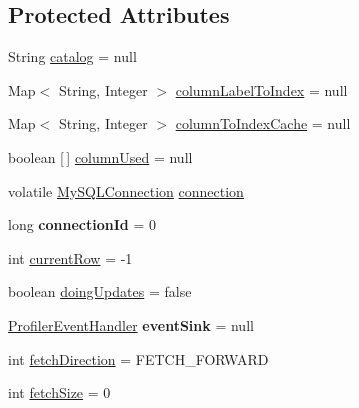 \subsection*{Protected Attributes}
\begin{DoxyCompactItemize}
\item 
String \mbox{\hyperlink{classcom_1_1mysql_1_1jdbc_1_1_result_set_impl_ae05d8a0ad69c96645b783537100fb95c}{catalog}} = null
\item 
Map$<$ String, Integer $>$ \mbox{\hyperlink{classcom_1_1mysql_1_1jdbc_1_1_result_set_impl_a1cb5423a275f9f2f1db8505250febb18}{column\+Label\+To\+Index}} = null
\item 
Map$<$ String, Integer $>$ \mbox{\hyperlink{classcom_1_1mysql_1_1jdbc_1_1_result_set_impl_a32a373e5b92a70b358e1c65f63620d56}{column\+To\+Index\+Cache}} = null
\item 
boolean \mbox{[}$\,$\mbox{]} \mbox{\hyperlink{classcom_1_1mysql_1_1jdbc_1_1_result_set_impl_add36b8fd2a3b4b678158051f1e7af285}{column\+Used}} = null
\item 
volatile \mbox{\hyperlink{interfacecom_1_1mysql_1_1jdbc_1_1_my_s_q_l_connection}{My\+S\+Q\+L\+Connection}} \mbox{\hyperlink{classcom_1_1mysql_1_1jdbc_1_1_result_set_impl_a5f96ad5c04f7b235a21ca79e3370b247}{connection}}
\item 
\mbox{\label{classcom_1_1mysql_1_1jdbc_1_1_result_set_impl_ad3b82ff2c8bf604415d0f3085c97a4ea}} 
long {\bfseries connection\+Id} = 0
\item 
int \mbox{\hyperlink{classcom_1_1mysql_1_1jdbc_1_1_result_set_impl_a8daed0ce077d243f49ca2da4e8e7e1dc}{current\+Row}} = -\/1
\item 
boolean \mbox{\hyperlink{classcom_1_1mysql_1_1jdbc_1_1_result_set_impl_accc14cd2f5cfc12f537b2ddd359dc5a0}{doing\+Updates}} = false
\item 
\mbox{\label{classcom_1_1mysql_1_1jdbc_1_1_result_set_impl_aa6b4c88b08c1049456a3082590f5225c}} 
\mbox{\hyperlink{interfacecom_1_1mysql_1_1jdbc_1_1profiler_1_1_profiler_event_handler}{Profiler\+Event\+Handler}} {\bfseries event\+Sink} = null
\item 
int \mbox{\hyperlink{classcom_1_1mysql_1_1jdbc_1_1_result_set_impl_a9c813e56f0ea36d2f182596cd0aca5a7}{fetch\+Direction}} = F\+E\+T\+C\+H\+\_\+\+F\+O\+R\+W\+A\+RD
\item 
int \mbox{\hyperlink{classcom_1_1mysql_1_1jdbc_1_1_result_set_impl_a440f376b65b2fe201ebe4a59c4d2dbfe}{fetch\+Size}} = 0

\end{DoxyCompactItemize}
